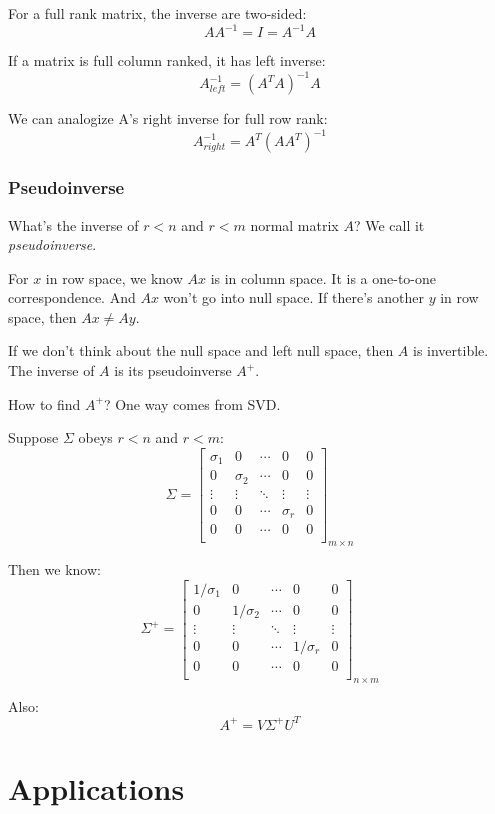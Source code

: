 \documentclass[10pt,a4paper,oneside,numbers=noenddot]{scrbook}
\theoremstyle{ctplain}
\theoremstyle{ctresult}
\begin{document}
For a full rank matrix, the inverse are two-sided:
\[
  AA^{-1} = I = A^{-1}A
\]

If a matrix is full column ranked, it has left inverse:
\[
  A^{-1}_{left} = (A^{T}A)^{-1}A
\]

We can analogize A's right inverse for full row rank:
\[
  A^{-1}_{right} = A^{T}(AA^{T})^{-1}
\]

\subsection{Pseudoinverse}

What's the inverse of $r < n $ and $r < m$ normal matrix $A$? We call it \emph{pseudoinverse}.

For $x$ in row space, we know $Ax$ is in column space. It is a one-to-one correspondence. And
$Ax$ won't go into null space. If there's another $y$ in row space, then $Ax \neq Ay$.

If we don't think about the null space and left null space, then $A$ is invertible. The inverse
of $A$ is its pseudoinverse $A^{+}$.

How to find $A^{+}$? One way comes from SVD.

Suppose $\Sigma$ obeys $r < n$ and $r < m$:
\[
  \Sigma = \begin{bmatrix}
    \sigma_1 & 0 & \cdots & 0 & 0 \\
    0 & \sigma_2 & \cdots & 0 & 0 \\
    \vdots & \vdots & \ddots & \vdots & \vdots \\
    0 & 0 & \cdots & \sigma_r & 0 \\
    0 & 0 & \cdots & 0 & 0 \\
    \end{bmatrix}_{m \times n}
\]

Then we know:
\[
  \Sigma^{+} = \begin{bmatrix}
    1/\sigma_1 & 0 & \cdots & 0 & 0 \\
    0 & 1/\sigma_2 & \cdots & 0 & 0 \\
    \vdots & \vdots & \ddots & \vdots & \vdots \\
    0 & 0 & \cdots & 1/\sigma_r & 0 \\
    0 & 0 & \cdots & 0 & 0 \\
    \end{bmatrix}_{n \times m}
\]

Also:
\[
  A^{+} = V\Sigma^{+}U^{T}
\]



\chapter{Applications}
\end{document}
